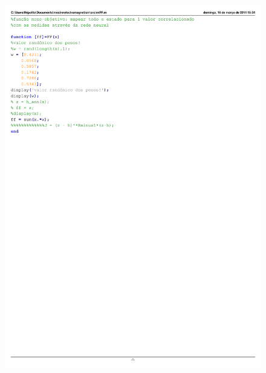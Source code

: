 \documentclass{IEEEtran}
\begin{document}
\begin{figure}
	\centering
	\includegraphics{FF.pdf}
	\label{FF}
\end{figure}
\end{document}
